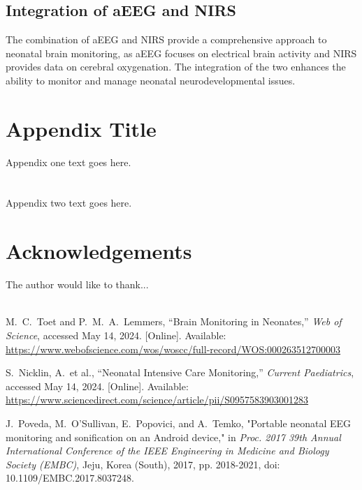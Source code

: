 \documentclass[12pt,journal,compsoc]{IEEEtran}
\begin{document}
\subsection{Integration of aEEG and NIRS}
The combination of aEEG and NIRS provide a comprehensive approach to neonatal brain monitoring, as aEEG focuses on electrical brain activity and NIRS provides data on cerebral oxygenation. The integration of the two enhances the ability to monitor and manage neonatal neurodevelopmental issues. 

\appendices
\section{Appendix Title}
Appendix one text goes here.

\section{}
Appendix two text goes here.


\section*{Acknowledgements}

The author would like to thank...\\ \\

\begin{thebibliography}{1}

M.~C.~Toet and P.~M.~A.~Lemmers, “Brain Monitoring in Neonates,” \emph{Web of Science}, accessed May 14, 2024. [Online]. Available: \url{https://www.webofscience.com/wos/woscc/full-record/WOS:000263512700003}

S.~Nicklin, A.~et al., “Neonatal Intensive Care Monitoring,” \emph{Current Paediatrics}, accessed May 14, 2024. [Online]. Available: \url{https://www.sciencedirect.com/science/article/pii/S0957583903001283}

J.~Poveda, M.~O'Sullivan, E.~Popovici, and A.~Temko, "Portable neonatal EEG monitoring and sonification on an Android device," in \emph{Proc. 2017 39th Annual International Conference of the IEEE Engineering in Medicine and Biology Society (EMBC)}, Jeju, Korea (South), 2017, pp. 2018-2021, doi: 10.1109/EMBC.2017.8037248.

\end{thebibliography}
\end{document}
